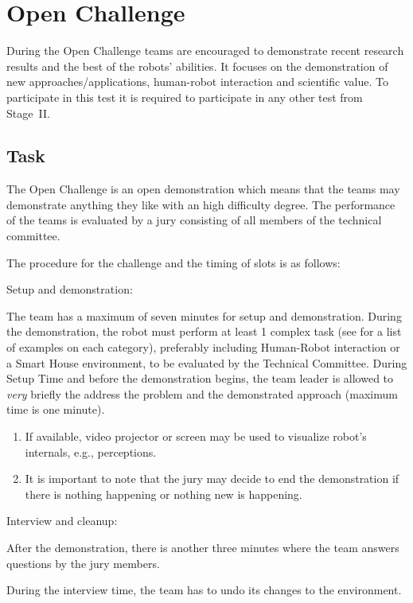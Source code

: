 \section{Open Challenge}

During the Open Challenge teams are encouraged to demonstrate recent research results and the best of the robots' abilities. It focuses on the demonstration of new approaches/applications, human-robot interaction and scientific value. To participate in this test it is required to participate in any other test from Stage~II.

\subsection{Task}

The Open Challenge is an open demonstration which means that the teams may demonstrate anything they like with an high difficulty degree. The performance of the teams is evaluated by a jury consisting of all members of the technical committee.

The procedure for the challenge and the timing of slots is as follows:
\begin{enumerate}
  {\bf\item Setup and demonstration:} The team has a maximum of seven minutes for setup and demonstration. During the demonstration, the robot must perform at least 1 complex task (see for a list of examples on each category), preferably including Human-Robot interaction or a Smart House environment, to be evaluated by the Technical Committee. During Setup Time and before the demonstration begins, the team leader is allowed to \emph{very} briefly the address the problem and the demonstrated approach (maximum time is one minute).

	\begin{enumerate}
		\item If available, video projector or screen may be used to visualize robot's internals, e.g., perceptions.
		\item It is important to note that the jury may decide to end the demonstration if there is nothing happening or nothing new is happening.
	\end{enumerate}
  {\bf\item Interview and cleanup:} After the demonstration, there is another three minutes where the team answers questions by the jury members.

  During the interview time, the team has to undo its changes to the environment.
\end{enumerate}

